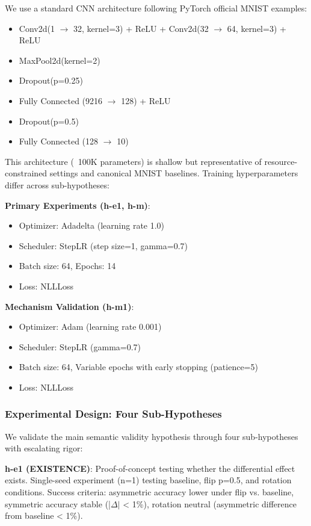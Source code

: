 We use a standard CNN architecture following PyTorch official MNIST examples:
\begin{itemize}
\item Conv2d(1 $\rightarrow$ 32, kernel=3) + ReLU + Conv2d(32 $\rightarrow$ 64, kernel=3) + ReLU
\item MaxPool2d(kernel=2)
\item Dropout(p=0.25)
\item Fully Connected (9216 $\rightarrow$ 128) + ReLU
\item Dropout(p=0.5)
\item Fully Connected (128 $\rightarrow$ 10)
\end{itemize}

This architecture (~100K parameters) is shallow but representative of resource-constrained settings and canonical MNIST baselines. Training hyperparameters differ across sub-hypotheses:

\textbf{Primary Experiments (h-e1, h-m)}:
\begin{itemize}
\item Optimizer: Adadelta (learning rate 1.0)
\item Scheduler: StepLR (step size=1, gamma=0.7)
\item Batch size: 64, Epochs: 14
\item Loss: NLLLoss
\end{itemize}

\textbf{Mechanism Validation (h-m1)}:
\begin{itemize}
\item Optimizer: Adam (learning rate 0.001)
\item Scheduler: StepLR (gamma=0.7)
\item Batch size: 64, Variable epochs with early stopping (patience=5)
\item Loss: NLLLoss
\end{itemize}

\subsubsection{Experimental Design: Four Sub-Hypotheses}

We validate the main semantic validity hypothesis through four sub-hypotheses with escalating rigor:

\textbf{h-e1 (EXISTENCE)}: Proof-of-concept testing whether the differential effect exists. Single-seed experiment (n=1) testing baseline, flip p=0.5, and rotation conditions. Success criteria: asymmetric accuracy lower under flip vs. baseline, symmetric accuracy stable (|$\Delta |$ < 1\%), rotation neutral (asymmetric difference from baseline < 1\%).

